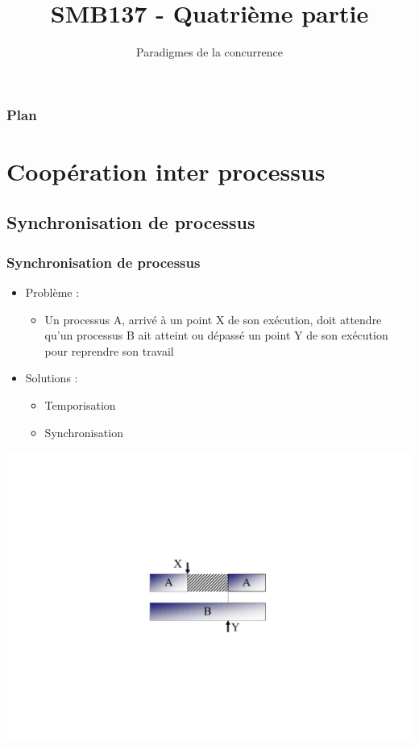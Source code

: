 

\title{SMB137 - Quatrième partie}
\subtitle{Paradigmes de la concurrence}


\frame[plain]{\titlepage}

\begin{frame}
 \frametitle{Plan}
 \tableofcontents
\end{frame}
 
\section{Coopération inter processus}
\subsection{Synchronisation de processus}

\begin{frame}
\frametitle{Synchronisation de processus}
\begin{itemize}
\item Problème :
\begin{itemize}
\item Un processus A, arrivé à un point X de son exécution, doit attendre qu'un processus B ait atteint ou dépassé un point Y de son exécution pour reprendre son travail
\end{itemize}
\item Solutions :
\begin{itemize}
\item Temporisation
\item Synchronisation
\end{itemize}
\end{itemize}
\begin{flushright}
\includegraphics[width=.4\textwidth]{../illustration/temporisation.pdf}
\end{flushright}
\end{frame}

